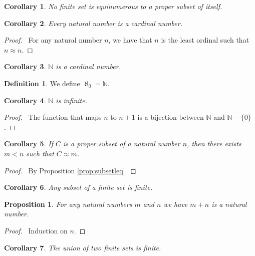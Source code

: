 \documentclass{book}
\let\qed\relax
\newtheorem{prop}[ax]{Proposition}
\newtheorem{cor}{Corollary}[ax]
\theoremstyle{definition}
\newtheorem{df}[ax]{Definition}
\begin{document}
\begin{cor}
No finite set is equinumerous to a proper subset of itself.
\end{cor}

\begin{cor}
Every natural number is a cardinal number.
\end{cor}

\begin{proof}
\pf\ For any natural number $n$, we have that $n$ is the least ordinal such that $n \approx n$. \qed
\end{proof}

\begin{cor}
$\mathbb{N}$ is a cardinal number.
\end{cor}

\begin{df}
We define $\aleph_0 = \mathbb{N}$.
\end{df}

\begin{cor}
$\mathbb{N}$ is infinite.
\end{cor}

\begin{proof}
\pf\ The function that maps $n$ to $n+1$ is a bijection between $\mathbb{N}$ and $\mathbb{N} - \{0\}$. \qed
\end{proof}

\begin{cor}
If $C$ is a proper subset of a natural number $n$, then there exists $m < n$ such that $C \approx m$.
\end{cor}

\begin{proof}
\pf\ By Proposition \ref{prop:subsetleq}. \qed
\end{proof}

\begin{cor}
Any subset of a finite set is finite.
\end{cor}

\begin{prop}
For any natural numbers $m$ and $n$ we have $m+n$ is a natural number.
\end{prop}

\begin{proof}
\pf\ Induction on $n$. \qed
\end{proof}

\begin{cor}
The union of two finite sets is finite.
\end{cor}
\end{document}
